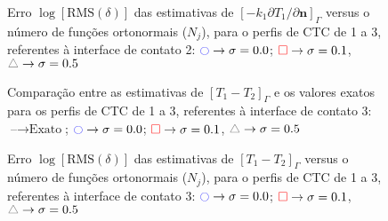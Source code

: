 \begin{figure}[h!b]
	\caption{Erro $\log[\text{RMS}(\delta)]$ das estimativas de $[-k_1 \partial T_1/\partial\mathbf{n}]_\Gamma$ versus o número de funções ortonormais ($N_j$), para o perfis de CTC de 1 a 3, referentes à interface de contato 2: $\textcolor{blue}{\ocircle} \rightarrow \sigma = 0.0$; $\textcolor{red}{\square} \rightarrow \sigma = 0.1$, $\textcolor{gray}{\triangle} \rightarrow \sigma = 0.5$}
\end{figure}

\begin{figure}[h!b]
\end{figure}


\begin{figure}[h!b]
	\caption{Comparação entre as estimativas de $[T_1 - T_2]_\Gamma$ e os valores exatos para os perfis de CTC de 1 a 3, referentes à interface de contato 3: $\text{--} \rightarrow \text{Exato}$; $\textcolor{blue}{\ocircle} \rightarrow \sigma = 0.0$; $\textcolor{red}{\square} \rightarrow \sigma = 0.1$, $\textcolor{gray}{\triangle} \rightarrow \sigma = 0.5$}
\end{figure}

\begin{figure}[h!b]
	\caption{Erro $\log[\text{RMS}(\delta)]$ das estimativas de $[T_1 - T_2]_\Gamma$ versus o número de funções ortonormais ($N_j$), para o perfis de CTC de 1 a 3, referentes à interface de contato 3: $\textcolor{blue}{\ocircle} \rightarrow \sigma = 0.0$; $\textcolor{red}{\square} \rightarrow \sigma = 0.1$, $\textcolor{gray}{\triangle} \rightarrow \sigma = 0.5$}
\end{figure}

